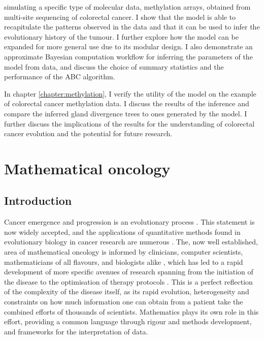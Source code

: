 simulating a specific type of molecular data, methylation arrays, obtained from
multi-site sequencing of colorectal cancer. I show that the model is able to
recapitulate the patterns observed in the data and that it can be used to infer
the evolutionary history of the tumour. I further explore how the model can be
expanded for more general use due to its modular design. I also demonstrate an
approximate Bayesian computation workflow for inferring the parameters of the
model from data, and discuss the choice of summary statistics and the
performance of the ABC algorithm.\par
In chapter \ref{chapter:methylation}, I verify the utility of the model on the
example of colorectal cancer methylation data. I discuss the results of the
inference and compare the inferred gland divergence trees to ones generated by
the model. I further discuss the implications of the results for the
understanding of colorectal cancer evolution and the potential for future
research. \par


\section{Mathematical oncology}
\subsection{Introduction}
Cancer emergence and progression is an evolutionary process \cite{nowell_clonal_1976, merlo_cancer_2006}.
This statement is now widely accepted, and the applications of quantitative methods found in evolutionary
biology in cancer research are numerous \cite{rockne_2019_2019, yin_review_2019, kourou_applied_2021}.
The, now well established, area of mathematical oncology is informed by clinicians, computer scientists,
mathematicians of all flavours, and biologists alike \cite{bull_hallmarks_2022}, which has led to a rapid
development of more specific avenues of research spanning from the initiation of the disease
\cite{paterson_mathematical_2020} to the optimisation of therapy protocols
\cite{west_survey_2023}. This is a perfect reflection of the complexity
of the disease itself, as its rapid evolution, heterogeneity and constraints on
how much information one can obtain from a patient take
the combined efforts of thousands of scientists. Mathematics plays its own role in this effort, providing
a common language through rigour and methods development, and frameworks for the interpretation of data.

